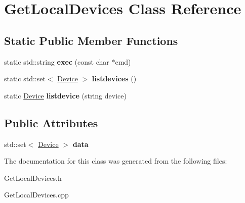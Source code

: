 \hypertarget{classGetLocalDevices}{}\section{Get\+Local\+Devices Class Reference}
\label{classGetLocalDevices}
\subsection*{Static Public Member Functions}
\begin{DoxyCompactItemize}
\item 
\mbox{\label{classGetLocalDevices_aee2acebc0960838cddc5ddb2474ab7ba}} 
static std\+::string {\bfseries exec} (const char $\ast$cmd)
\item 
\mbox{\label{classGetLocalDevices_a018c0984e1d9a4908220a8af573ea51c}} 
static std\+::set$<$ \hyperlink{classDevice}{Device} $>$ {\bfseries listdevices} ()
\item 
\mbox{\label{classGetLocalDevices_a9fb5548015a6108828c63d61532d3b0f}} 
static \hyperlink{classDevice}{Device} {\bfseries listdevice} (string device)
\end{DoxyCompactItemize}
\subsection*{Public Attributes}
\begin{DoxyCompactItemize}
\item 
\mbox{\label{classGetLocalDevices_a8586f10ddee9afee2bad96d10f914654}} 
std\+::set$<$ \hyperlink{classDevice}{Device} $>$ {\bfseries data}
\end{DoxyCompactItemize}


The documentation for this class was generated from the following files\+:\begin{DoxyCompactItemize}
\item 
Get\+Local\+Devices.\+h\item 
Get\+Local\+Devices.\+cpp\end{DoxyCompactItemize}
